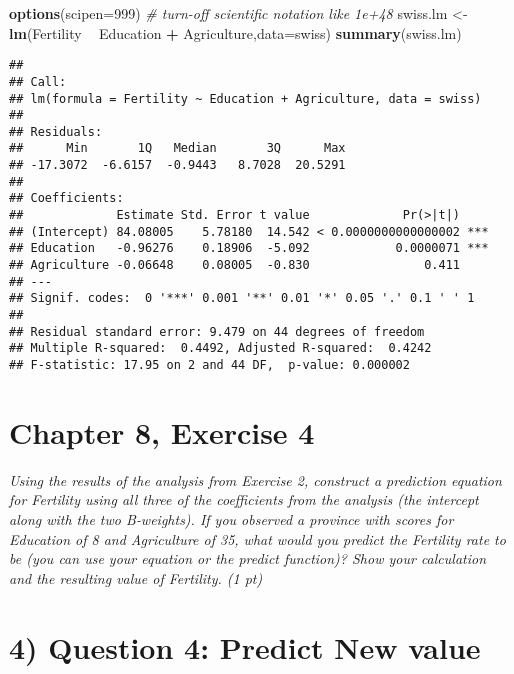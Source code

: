 \documentclass[]{article}
\newenvironment{Shaded}{\begin{snugshade}}{\end{snugshade}}
\newcommand{\CommentTok}[1]{\textcolor[rgb]{0.56,0.35,0.01}{\textit{#1}}}
\newcommand{\DataTypeTok}[1]{\textcolor[rgb]{0.13,0.29,0.53}{#1}}
\newcommand{\DecValTok}[1]{\textcolor[rgb]{0.00,0.00,0.81}{#1}}
\newcommand{\KeywordTok}[1]{\textcolor[rgb]{0.13,0.29,0.53}{\textbf{#1}}}
\newcommand{\NormalTok}[1]{#1}
\newcommand{\OperatorTok}[1]{\textcolor[rgb]{0.81,0.36,0.00}{\textbf{#1}}}
\newcommand{\StringTok}[1]{\textcolor[rgb]{0.31,0.60,0.02}{#1}}
\begin{document}
\begin{Shaded}
\begin{Highlighting}[]
\KeywordTok{options}\NormalTok{(}\DataTypeTok{scipen=}\DecValTok{999}\NormalTok{)  }\CommentTok{# turn-off scientific notation like 1e+48}
\NormalTok{swiss.lm <-}\StringTok{ }\KeywordTok{lm}\NormalTok{(Fertility }\OperatorTok{~}\StringTok{ }\NormalTok{Education }\OperatorTok{+}\StringTok{ }\NormalTok{Agriculture,}\DataTypeTok{data=}\NormalTok{swiss)}
\KeywordTok{summary}\NormalTok{(swiss.lm)}
\end{Highlighting}
\end{Shaded}

\begin{verbatim}
## 
## Call:
## lm(formula = Fertility ~ Education + Agriculture, data = swiss)
## 
## Residuals:
##      Min       1Q   Median       3Q      Max 
## -17.3072  -6.6157  -0.9443   8.7028  20.5291 
## 
## Coefficients:
##             Estimate Std. Error t value             Pr(>|t|)    
## (Intercept) 84.08005    5.78180  14.542 < 0.0000000000000002 ***
## Education   -0.96276    0.18906  -5.092            0.0000071 ***
## Agriculture -0.06648    0.08005  -0.830                0.411    
## ---
## Signif. codes:  0 '***' 0.001 '**' 0.01 '*' 0.05 '.' 0.1 ' ' 1
## 
## Residual standard error: 9.479 on 44 degrees of freedom
## Multiple R-squared:  0.4492, Adjusted R-squared:  0.4242 
## F-statistic: 17.95 on 2 and 44 DF,  p-value: 0.000002
\end{verbatim}

\hypertarget{chapter-8-exercise-4}{%
\section{Chapter 8, Exercise 4}\label{chapter-8-exercise-4}}

\emph{Using the results of the analysis from Exercise 2, construct a
prediction equation for Fertility using all three of the coefficients
from the analysis (the intercept along with the two B‐weights). If you
observed a province with scores for Education of 8 and Agriculture of
35, what would you predict the Fertility rate to be (you can use your
equation or the predict function)? Show your calculation and the
resulting value of Fertility. (1 pt)}

\hypertarget{question-4-predict-new-value}{%
\section{4) Question 4: Predict New
value}\label{question-4-predict-new-value}}
\end{document}
